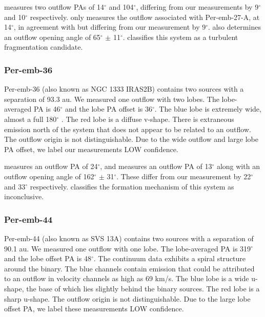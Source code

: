 \documentclass[linenumbers,twocolumn, twocolappendix]{aastex631}
\begin{document}
\cite{Plunkett_2013} measures two outflow PAs of 14$^\circ$ and 104$^\circ$, differing from our measurements by 9$^\circ$ and 10$^\circ$ respectively. \cite{Dunham_et_al_2024} only measures the outflow associated with Per-emb-27-A, at 14$^\circ$, in agreement with \cite{Plunkett_2013} but differing from our measurement by 9$^\circ$. \cite{Dunham_et_al_2024} also determines an outflow opening angle of 65$^\circ$ $\pm$ 11$^\circ$. \cite{Reynolds_et_al_2024} classifies this system as a turbulent fragmentation candidate.

\subsubsection{Per-emb-36}
Per-emb-36 (also known as NGC 1333 IRAS2B) contains two sources with a separation of 93.3 au. We measured one outflow with two lobes. The lobe-averaged PA is 46$^\circ$ and the lobe PA offset is 36$^\circ$. The blue lobe is extremely wide, almost a full 180$^\circ$ \citep{Dunham_et_al_2024}. The red lobe is a diffuse v-shape. There is extraneous emission north of the system that does not appear to be related to an outflow. The outflow origin is not distinguishable. Due to the wide outflow and large lobe PA offset, we label our measurements LOW confidence.

\cite{Plunkett_2013} measures an outflow PA of 24$^\circ$, and \cite{Dunham_et_al_2024} measures an outflow PA of 13$^\circ$ along with an outflow opening angle of 162$^\circ$ $\pm$ 31$^\circ$. These differ from our measurement by 22$^\circ$ and 33$^\circ$ respectively. \cite{Reynolds_et_al_2024} classifies the formation mechanism of this system as inconclusive.

\subsubsection{Per-emb-44}
Per-emb-44 (also known as SVS 13A) contains two sources with a separation of 90.1 au. We measured one outflow with one lobe. The lobe-averaged PA is 319$^\circ$ and the lobe offset PA is 48$^\circ$. The continuum data exhibits a spiral structure around the binary. The blue channels contain emission that could be attributed to an outflow in velocity channels as high as 69 km/s. The blue lobe is a wide u-shape, the base of which lies slightly behind the binary sources. The red lobe is a sharp u-shape. The outflow origin is not distinguishable. Due to the large lobe offset PA, we label these measurements LOW confidence.
\end{document}
